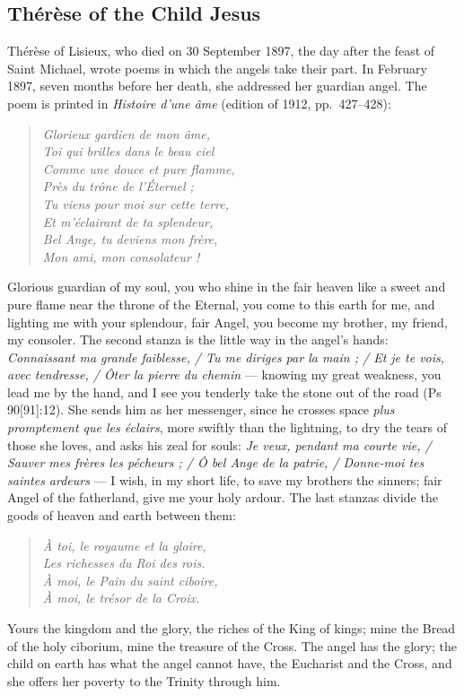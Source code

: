 \sectionguard\subsection{Thérèse of the Child Jesus}\label{sec:sa-therese}

Thérèse of Lisieux, who died on 30 September 1897, the day after the feast
of Saint Michael, wrote poems in which the angels take their part. In February 1897, seven
months before her death, she addressed her guardian angel. The poem is printed in \emph{Histoire
d'une âme} (edition of 1912, pp.~427--428):
\begin{quote}
\textit{Glorieux gardien de mon âme,\\
Toi qui brilles dans le beau ciel\\
Comme une douce et pure flamme,\\
Près du trône de l'Éternel ;\\
Tu viens pour moi sur cette terre,\\
Et m'éclairant de ta splendeur,\\
Bel Ange, tu deviens mon frère,\\
Mon ami, mon consolateur !}
\end{quote}
Glorious guardian of my soul, you who shine in the fair heaven like a sweet
and pure flame near the throne of the Eternal, you come to this earth for
me, and lighting me with your splendour, fair Angel, you become my brother,
my friend, my consoler. The second stanza is the little way in the
angel's hands: \textit{Connaissant ma grande faiblesse, / Tu me diriges par
la main ; / Et je te vois, avec tendresse, / Ôter la pierre du chemin} ---
knowing my great weakness, you lead me by the hand, and I see you tenderly
take the stone out of the road (Ps 90[91]:12). She sends him as her
messenger, since he crosses space \textit{plus promptement que les éclairs},
more swiftly than the lightning, to dry the tears of those she loves, and
asks his zeal for souls: \textit{Je veux, pendant ma courte vie, / Sauver mes
frères les pécheurs ; / Ô bel Ange de la patrie, / Donne-moi tes saintes
ardeurs} --- I wish, in my short life, to save my brothers the sinners; fair
Angel of the fatherland, give me your holy ardour. The last stanzas divide
the goods of heaven and earth between them:
\begin{quote}
\textit{À toi, le royaume et la gloire,\\
Les richesses du Roi des rois.\\
À moi, le Pain du saint ciboire,\\
À moi, le trésor de la Croix.}
\end{quote}
Yours the kingdom and the glory, the riches of the King of kings; mine the
Bread of the holy ciborium, mine the treasure of the Cross. The angel has
the glory; the child on earth has what the angel cannot have, the Eucharist
and the Cross, and she offers her poverty to the Trinity through him.

